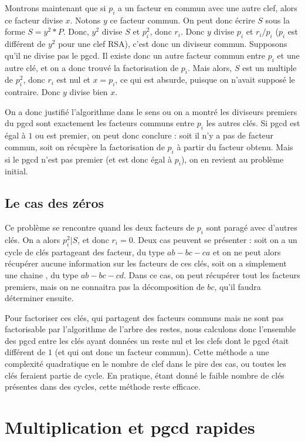 \documentclass[a4paper,10pt]{article}
\begin{document}
  Montrons maintenant que si $p_i$ a un facteur en commun avec une autre clef, alors ce facteur divise $x$. Notons $y$ ce facteur commun. On peut donc écrire $S$ sous la forme $S = y^2*P$. Donc, $y^2$ divise $S$ et $p_i^2$, donc $r_i$.
  Donc $y$ divise $p_i$ et $r_i/p_i$ ($p_i$ est différent de $y^2$ pour une clef RSA), c'est donc un diviseur commun.
  Supposons qu'il ne divise pas le pgcd. Il existe donc un autre facteur commun entre $p_i$ et une autre clé, et on a donc trouvé la factorisation de $p_i$. Mais alors, $S$ est un multiple de $p_i^2$, donc $r_i$ est nul et $x = p_i$, ce qui est absurde, puisque on n'avait supposé le contraire. Donc $y$ divise bien $x$.
  
  On a donc justifié l'algorithme dans le sens ou on a montré les diviseurs premiers du pgcd sont exactement les facteurs communs entre $p_i$ les autres clés. Si pgcd est égal à $1$ ou est premier, on peut donc conclure : soit il n'y a pas de facteur commun, soit on récupère la factorisation de $p_i$ à partir du facteur obtenu. Mais si le pgcd n'est pas premier (et est donc égal à $p_i$), on en revient au problème initial.
  
   \subsection{Le \og{}cas des zéros\fg}
  
  Ce problème se rencontre quand les deux facteurs de $p_i$ sont paragé avec d'autres clés. On a alors $p_i^2 | S$, et donc $r_i = 0$. Deux cas peuvent se présenter : soit on a un \og cycle \fg{} de clés partageant des facteur, du type $ab - bc - ca$ et on ne peut alors récupérer aucune information sur les facteurs de ces clés, soit on a simplement une \og chaine \fg, du type $ab - bc - cd$. Dans ce cas, on peut récupérer tout les facteurs premiers, mais on ne connaitra pas la décomposition de $bc$, qu'il faudra déterminer ensuite.
  
  Pour factoriser ces clés, qui partagent des facteurs communs mais ne sont pas factorisable par l'algorithme de l'arbre des restes, nous calculons donc l'ensemble des pgcd entre les clés ayant données un reste nul et les clefs dont le pgcd était différent de $1$ (et qui ont donc un facteur commun). Cette méthode a une complexité quadratique en le nombre de clef dans le pire des cas, ou toutes les clés feraient partie de cycle. En pratique, étant donné le faible nombre de clés présentes dans des cycles, cette méthode reste efficace.
  

\section{Multiplication et pgcd rapides}
\end{document}
